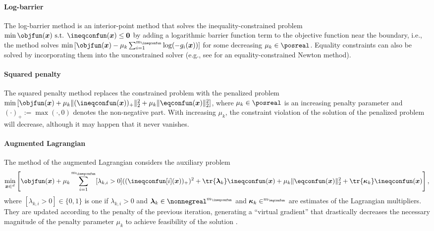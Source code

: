 \paragraph{Log-barrier}

The log-barrier method
is an interior-point method that solves the inequality-constrained problem
$\min \objfun(\*x) \text{ s.t. } \ineqconfun(\*x) \le \*0$ by
adding a logarithmic barrier function term to the objective function
near the boundary, i.e., the method solves
$\min\, [\objfun(\*x) - \mu_k \sum_{i=1}^{m_{\ineqconfun}} \log(-g_i(\*x))]$
for some decreasing $\mu_k \in \posreal$.
Equality constraints can also be solved by incorporating them
into the unconstrained solver (e.g., see \cite{Boyd04Convex}
for an equality-constrained Newton method).

\paragraph{Squared penalty}

The squared penalty method
replaces the constrained problem with the penalized problem
$\min\, [\objfun(\*x) + \mu_k \norm[2]{(\ineqconfun(\*x))_{+}}^2 +
\mu_k \norm[2]{\eqconfun(\*x)}^2]$,
where $\mu_k \in \posreal$ is an increasing penalty parameter and
$(\cdot)_{+} := \max(\cdot, 0)$ denotes the non-negative part.
With increasing $\mu_k$, the constraint violation of the solution of
the penalized problem will decrease, although it may happen
that it never vanishes.

\paragraph{Augmented Lagrangian}

The method of the augmented Lagrangian
considers the auxiliary problem
\begin{equation}
  \min_{\*x \in \real^d} \left[
    \objfun(\*x) + \mu_k \sum_{i=1}^{m_{\ineqconfun}} [\lambda_{k,i} > 0]
    ((\ineqconfun[i](\*x))_{+})^2 + \tr{\*\lambda_k} \ineqconfun(\*x) +
    \mu_k \norm[2]{\eqconfun(\*x)}^2 +
    \tr{\*\kappa_k} \ineqconfun(\*x)
  \right],
\end{equation}
where $[\lambda_{k,i} > 0] \in \{0, 1\}$ is one if $\lambda_{k,i} > 0$ and
$\*\lambda_k \in \nonnegreal^{m_{\ineqconfun}}$ and
$\*\kappa_k \in \real^{m_{\eqconfun}}$ are estimates of the
Lagrangian multipliers.
They are updated according to the penalty of the previous iteration,
generating a ``virtual gradient'' that drastically decreases
the necessary magnitude of the penalty parameter $\mu_k$
to achieve feasibility of the solution \cite{Toussaint15Introduction}.

